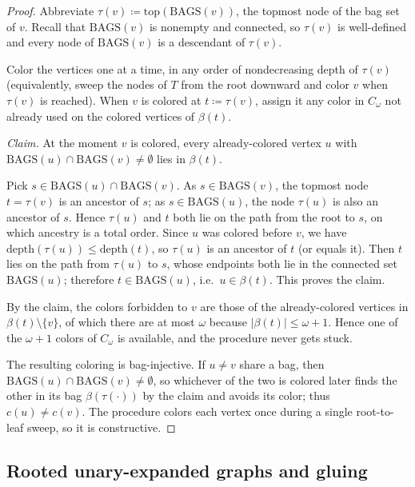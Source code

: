 \documentclass[11pt]{article}
\theoremstyle{definition}
\newcommand{\defeq}{\coloneqq}
\newcommand{\Bags}{\mathrm{BAGS}}
\newcommand{\topnode}{\mathrm{top}}
\begin{document}
\begin{proof}
Abbreviate \(\tau(v)\defeq\topnode(\Bags(v))\), the topmost node of the bag set of
\(v\).  Recall that \(\Bags(v)\) is nonempty and connected, so \(\tau(v)\) is
well-defined and every node of \(\Bags(v)\) is a descendant of \(\tau(v)\).

Color the vertices one at a time, in any order of nondecreasing depth of
\(\tau(v)\) (equivalently, sweep the nodes of \(T\) from the root downward and
color \(v\) when \(\tau(v)\) is reached).  When \(v\) is colored at
\(t\defeq\tau(v)\), assign it any color in \(C_\omega\) not already used on the
colored vertices of \(\beta(t)\).

\emph{Claim.} At the moment \(v\) is colored, every already-colored vertex \(u\)
with \(\Bags(u)\cap\Bags(v)\ne\emptyset\) lies in \(\beta(t)\).

Pick \(s\in\Bags(u)\cap\Bags(v)\).  As \(s\in\Bags(v)\), the topmost node
\(t=\tau(v)\) is an ancestor of \(s\); as \(s\in\Bags(u)\), the node \(\tau(u)\)
is also an ancestor of \(s\).  Hence \(\tau(u)\) and \(t\) both lie on the path
from the root to \(s\), on which ancestry is a total order.  Since \(u\) was
colored before \(v\), we have \(\mathrm{depth}(\tau(u))\le\mathrm{depth}(t)\), so
\(\tau(u)\) is an ancestor of \(t\) (or equals it).  Then \(t\) lies on the path
from \(\tau(u)\) to \(s\), whose endpoints both lie in the connected set
\(\Bags(u)\); therefore \(t\in\Bags(u)\), i.e.\ \(u\in\beta(t)\).  This proves the
claim.

By the claim, the colors forbidden to \(v\) are those of the already-colored
vertices in \(\beta(t)\setminus\{v\}\), of which there are at most \(\omega\)
because \(|\beta(t)|\le\omega+1\).  Hence one of the \(\omega+1\) colors of
\(C_\omega\) is available, and the procedure never gets stuck.

The resulting coloring is bag-injective.  If \(u\ne v\) share a bag, then
\(\Bags(u)\cap\Bags(v)\ne\emptyset\), so whichever of the two is colored later finds the
other in its bag \(\beta(\tau(\cdot))\) by the claim and avoids its color; thus
\(c(u)\ne c(v)\).  The procedure colors each vertex once during a single
root-to-leaf sweep, so it is constructive.
\end{proof}

\subsection{Rooted unary-expanded graphs and gluing}
\end{document}
